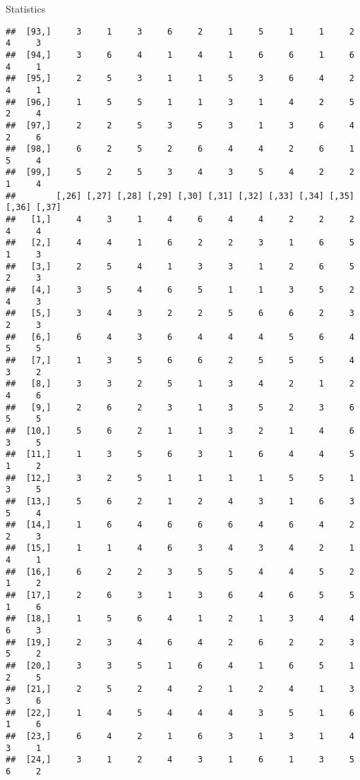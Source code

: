 \documentclass[
  ignorenonframetext,
]{beamer}
\begin{document}
\begin{frame}[fragile]{Statistics}
\begin{verbatim}
##  [93,]     3     1     3     6     2     1     5     1     1     2     4     3
##  [94,]     3     6     4     1     4     1     6     6     1     6     4     1
##  [95,]     2     5     3     1     1     5     3     6     4     2     4     1
##  [96,]     1     5     5     1     1     3     1     4     2     5     2     4
##  [97,]     2     2     5     3     5     3     1     3     6     4     2     6
##  [98,]     6     2     5     2     6     4     4     2     6     1     5     4
##  [99,]     5     2     5     3     4     3     5     4     2     2     1     4
##        [,26] [,27] [,28] [,29] [,30] [,31] [,32] [,33] [,34] [,35] [,36] [,37]
##   [1,]     4     3     1     4     6     4     4     2     2     2     4     4
##   [2,]     4     4     1     6     2     2     3     1     6     5     1     3
##   [3,]     2     5     4     1     3     3     1     2     6     5     2     3
##   [4,]     3     5     4     6     5     1     1     3     5     2     4     3
##   [5,]     3     4     3     2     2     5     6     6     2     3     2     3
##   [6,]     6     4     3     6     4     4     4     5     6     4     5     5
##   [7,]     1     3     5     6     6     2     5     5     5     4     3     2
##   [8,]     3     3     2     5     1     3     4     2     1     2     4     6
##   [9,]     2     6     2     3     1     3     5     2     3     6     5     5
##  [10,]     5     6     2     1     1     3     2     1     4     6     3     5
##  [11,]     1     3     5     6     3     1     6     4     4     5     1     2
##  [12,]     3     2     5     1     1     1     1     5     5     1     3     5
##  [13,]     5     6     2     1     2     4     3     1     6     3     5     4
##  [14,]     1     6     4     6     6     6     4     6     4     2     2     3
##  [15,]     1     1     4     6     3     4     3     4     2     1     4     1
##  [16,]     6     2     2     3     5     5     4     4     5     2     1     2
##  [17,]     2     6     3     1     3     6     4     6     5     5     1     6
##  [18,]     1     5     6     4     1     2     1     3     4     4     6     3
##  [19,]     2     3     4     6     4     2     6     2     2     3     5     2
##  [20,]     3     3     5     1     6     4     1     6     5     1     2     5
##  [21,]     2     5     2     4     2     1     2     4     1     3     3     6
##  [22,]     1     4     5     4     4     4     3     5     1     6     1     6
##  [23,]     6     4     2     1     6     3     1     3     1     4     3     1
##  [24,]     3     1     2     4     3     1     6     1     3     5     6     2

\end{verbatim}
\end{frame}
\end{document}
